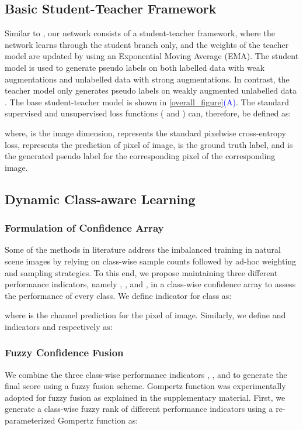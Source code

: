 \documentclass[runningheads]{llncs}
\begin{document}
\subsection{Basic Student-Teacher Framework}
Similar to \cite{tarvainen2017mean}, our network consists of a student-teacher framework, where the network learns through the student branch only, and the weights of the teacher model are updated by using an Exponential Moving Average (EMA). The student model is used to generate pseudo labels  on both labelled data  with weak augmentations and unlabelled data  with strong augmentations. In contrast, the teacher model only generates pseudo labels on weakly augmented unlabelled data . The base student-teacher model is shown in \autoref{overall_figure}\textcolor{blue}{(A)}. The standard supervised and unsupervised loss functions ( and ) can, therefore, be defined as:



where,  is the image dimension,  represents the standard pixelwise cross-entropy loss,  represents the prediction of  pixel of  image,  is the ground truth label, and  is the generated pseudo label for the corresponding pixel of the corresponding image.

\subsection{Dynamic Class-aware Learning}

\subsubsection{Formulation of Confidence Array}\label{confidence-array}
Some of the methods in literature \cite{li2020overcoming,hu2021adaptive} address the imbalanced training in natural scene images by relying on class-wise sample counts followed by ad-hoc weighting and sampling strategies. To this end, we propose maintaining three different performance indicators, namely , , and , in a class-wise confidence array to assess the performance of every class. We define  indicator  for class  as:

where  is the  channel prediction for the  pixel of  image. Similarly, we define  and  indicators  and  respectively as:





\subsubsection{Fuzzy Confidence Fusion}\label{fuzzy_fusion}
We combine the three class-wise performance indicators , , and  to generate the final  score using a fuzzy fusion scheme. Gompertz function was experimentally adopted for fuzzy fusion as explained in the supplementary material. First, we generate a class-wise fuzzy rank of different performance indicators using a re-parameterized Gompertz function \cite{kundu2021fuzzy} as:
\end{document}
